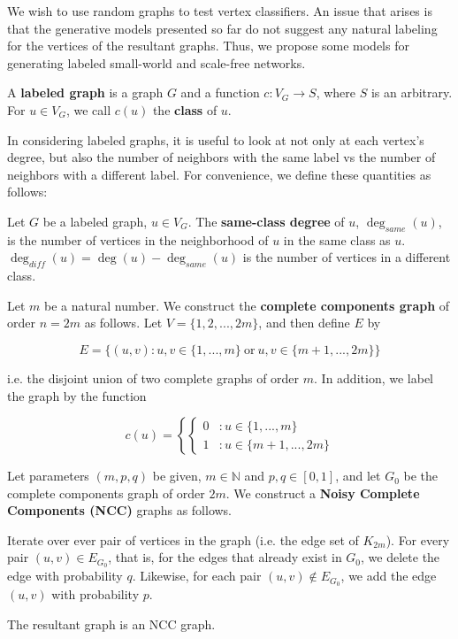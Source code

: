 We wish to use random graphs to test vertex classifiers. An issue that arises is that the generative
models presented so far do not suggest any natural labeling for the vertices of the resultant graphs.
Thus, we propose some models for generating labeled small-world and scale-free networks.

\begin{definition}
  A \textbf{labeled graph} is a graph $G$ and a function $c : V_G \to S$, where $S$ is an arbitrary.
  For $u \in V_G$, we call $c(u)$ the \textbf{class} of $u$.
\end{definition}

In considering labeled graphs, it is useful to look at not only at each vertex's degree, but also the
number of neighbors with the same label vs the number of neighbors with a different label. For
convenience, we define these quantities as follows:

\begin{definition}
  Let $G$ be a labeled graph, $u \in V_G$. The \textbf{same-class degree} of $u$, $\deg_{same}(u)$, is
  the number of vertices in the neighborhood of $u$ in the same class as $u$. $\deg_{diff}(u) =
  \deg(u) - \deg_{same}(u)$ is the number of vertices in a different class.
\end{definition}


\begin{definition}
  Let $m$ be a natural number. We construct the \textbf{complete components
    graph} of order $n = 2m$ as follows. Let $V = \{1,2, ..., 2m\}$, and then define
  $E$ by

  \[
    E = \{ (u,v) : u,v \in \{1,...,m\} ~\text{or}~ u,v \in \{m+1,...,2m\} \}
  \]

  i.e. the disjoint union of two complete graphs of order $m$. In addition, we label the graph by the
  function

  \[c(u) = \left\{
      \begin{cases}
        0 &: u \in \{1,...,m\} \\
        1 &: u \in \{m+1,...,2m\}
      \end{cases}
    \right.\]
\end{definition}

\begin{definition}
  \label{def:ncc}
  Let parameters $(m,p,q)$ be given, $m \in \mathbb{N}$ and $p,q \in [0,1]$, and let $G_0$ be the
  complete components graph of order $2m$. We construct a \textbf{Noisy Complete Components (NCC)}
  graphs as follows.

  Iterate over ever pair of vertices in the graph (i.e. the edge set of
  $K_{2m}$). For every pair $(u,v) \in E_{G_0}$, that is, for the edges that
  already exist in $G_0$, we delete the edge with probability $q$. Likewise, for
  each pair $(u,v) \notin E_{G_0}$, we add the edge $(u,v)$ with probability
  $p$.

  The resultant graph is an NCC graph.
\end{definition}

